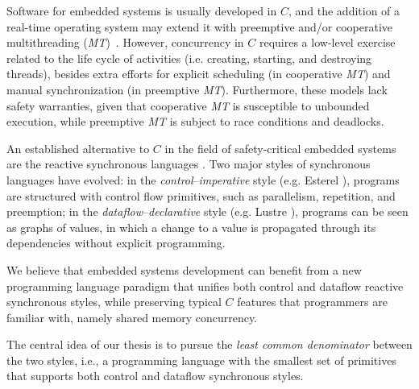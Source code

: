 \documentclass[pdftex,12pt,a4paper]{article}
\begin{document}
Software for embedded systems is usually developed in $C$, and the addition of 
a real-time operating system may extend it with preemptive and/or cooperative 
multithreading (\emph{MT})~\cite{wsn.protothreads}.
However, concurrency in $C$ requires a low-level exercise related to the life 
cycle of activities (i.e. creating, starting, and destroying threads), besides 
extra efforts for explicit scheduling (in cooperative \emph{MT}) and manual
synchronization (in preemptive \emph{MT}).
Furthermore, these models lack safety warranties, given that 
cooperative \emph{MT} is susceptible to unbounded execution, while 
preemptive \emph{MT} is subject to race conditions and deadlocks.

An established alternative to $C$ in the field of safety-critical embedded 
systems are the reactive synchronous languages \cite{rp.twelve}.
Two major styles of synchronous languages have evolved:
in the \emph{control}--\emph{imperative} style (e.g. Esterel 
\cite{esterel.design}), programs are structured with control flow primitives, 
such as parallelism, repetition, and preemption;
in the \emph{dataflow}--\emph{declarative} style (e.g. Lustre 
\cite{lustre.ieee91}), programs can be seen as graphs of values, in which a 
change to a value is propagated through its dependencies without explicit 
programming.

We believe that embedded systems development can benefit from a new programming 
language paradigm that unifies both control and dataflow reactive synchronous 
styles, while preserving typical $C$ features that programmers are familiar 
with, namely shared memory concurrency.

The central idea of our thesis is to pursue the \emph{least common denominator} 
between the two styles, i.e., a programming language with the smallest set of 
primitives that supports both control and dataflow synchronous styles.
\end{document}
